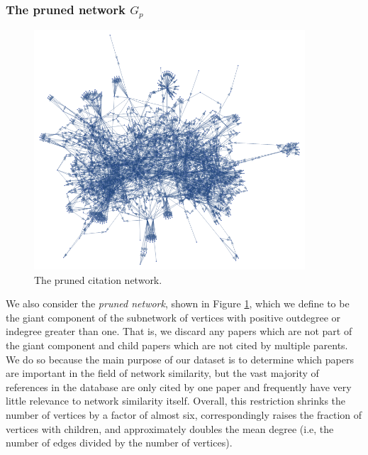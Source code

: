 \documentclass[12pt]{thesis}
\theoremstyle{plain}
\theoremstyle{definition}
\theoremstyle{remark}
\begin{document}
\subsubsection{The pruned network $G_p$}

\begin{figure}[h]
\centering
\includegraphics[width=0.9\textwidth]{subnetwork.png}
\caption{The pruned citation network.}
\label{fig:pruned_network}
\end{figure}

We also consider the \textit{pruned network}, shown in Figure \ref{fig:pruned_network}, which we define to be the giant component of the subnetwork of vertices with positive outdegree or indegree greater than one. That is, we discard any papers which are not part of the giant component and child papers which are not cited by multiple parents. We do so because the main purpose of our dataset is to determine which papers are important in the field of network similarity, but the vast majority of references in the database are only cited by one paper and frequently have very little relevance to network similarity itself. Overall, this restriction shrinks the number of vertices by a factor of almost six, correspondingly raises the fraction of vertices with children, and approximately doubles the mean degree (i.e, the number of edges divided by the number of vertices).
\end{document}
